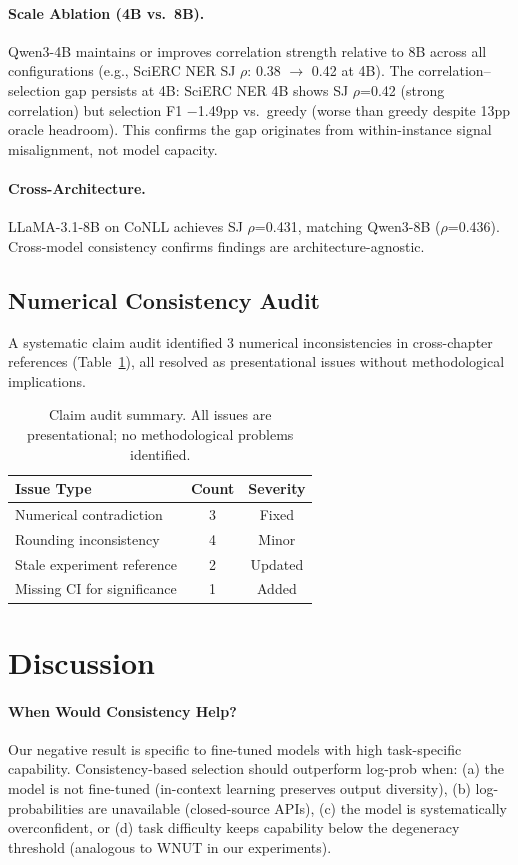 \documentclass[11pt]{article}
\begin{document}
\paragraph{Scale Ablation (4B vs.\ 8B).} Qwen3-4B maintains or improves correlation strength relative to 8B across all configurations (e.g., SciERC NER SJ $\rho$: 0.38 $\rightarrow$ 0.42 at 4B). The correlation--selection gap persists at 4B: SciERC NER 4B shows SJ $\rho$=0.42 (strong correlation) but selection F1 $-$1.49pp vs.\ greedy (worse than greedy despite 13pp oracle headroom). This confirms the gap originates from within-instance signal misalignment, not model capacity.

\paragraph{Cross-Architecture.} LLaMA-3.1-8B on CoNLL achieves SJ $\rho$=0.431, matching Qwen3-8B ($\rho$=0.436). Cross-model consistency confirms findings are architecture-agnostic.

\subsection{Numerical Consistency Audit}

A systematic claim audit identified 3 numerical inconsistencies in cross-chapter references (Table~\ref{tab:audit}), all resolved as presentational issues without methodological implications.

\begin{table}[t]
\centering
\small
\caption{Claim audit summary. All issues are presentational; no methodological problems identified.}
\label{tab:audit}
\begin{tabular}{lcc}
\toprule
Issue Type & Count & Severity \\
\midrule
Numerical contradiction & 3 & Fixed \\
Rounding inconsistency & 4 & Minor \\
Stale experiment reference & 2 & Updated \\
Missing CI for significance & 1 & Added \\
\bottomrule
\end{tabular}
\end{table}

\section{Discussion}

\paragraph{When Would Consistency Help?} Our negative result is specific to fine-tuned models with high task-specific capability. Consistency-based selection should outperform log-prob when: (a) the model is not fine-tuned (in-context learning preserves output diversity), (b) log-probabilities are unavailable (closed-source APIs), (c) the model is systematically overconfident, or (d) task difficulty keeps capability below the degeneracy threshold (analogous to WNUT in our experiments).
\end{document}
